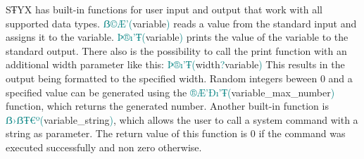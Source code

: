SŦYX has built-in functions for user input and output that work with all supported data types. 
\textcolor{teal}{ẞ©Æ’(}variable\textcolor{teal}{)} reads a value 
from the standard input and assigns it to the variable.
\textcolor{teal}{Þ®ı’Ŧ(}variable\textcolor{teal}{)} prints the value of the variable to the standard output.
There also is the possibility to call the print function with an additional width parameter
like this: \textcolor{teal}{Þ®ı’Ŧ(}width\textcolor{teal}{?}variable\textcolor{teal}{)}
This results in the output being formatted to the specified width.\newline
\newline
Random integers beween 0 and a specified value can be generated using the 
\textcolor{teal}{®Æ’Ðı’Ŧ(}variable\_max\_number\textcolor{teal}{)} function,
which returns the generated number.\newline
\newline
Another built-in function is \textcolor{teal}{ẞ›ẞŦ€º(}variable\_string\textcolor{teal}{)},
which allows the user to call a system command  with a string as parameter.
The return value of this function is 0 if the command was executed successfully and non zero otherwise.